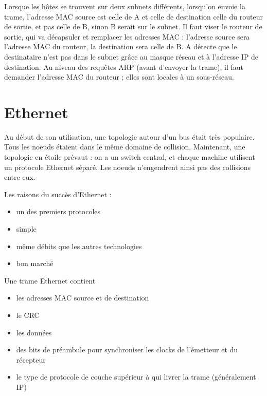 

Lorsque les hôtes se trouvent sur deux subnets différents, lorsqu'on envoie la trame, l'adresse MAC source est celle de A et celle de destination celle du routeur de sortie, et pas celle de B, sinon B serait sur le subnet. Il faut viser le routeur de sortie, qui va décapsuler et remplacer les adresses MAC : l'adresse source sera l'adresse MAC du routeur, la destination sera celle de B. A détecte que le destinataire n'est pas dans le subnet grâce au masque réseau et à l'adresse IP de destination. Au niveau des requêtes ARP (avant d'envoyer la trame), il faut demander l'adresse MAC du routeur ; elles sont locales à un sous-réseau.



\section{Ethernet}

Au début de son utilisation, une topologie autour d'un bus était très populaire. Tous les noeuds étaient dans le même domaine de collision. Maintenant, une topologie en étoile prévaut : on a un switch central, et chaque machine utilisent un protocole Ethernet séparé. Les noeuds n'engendrent ainsi pas des collisions entre eux.

	

Les raisons du succès d'Ethernet :

\begin{itemize}
	\item un des premiers protocoles
	\item simple
	\item même débits que les autres technologies
	\item bon marché
\end{itemize}


Une trame Ethernet contient

\begin{itemize}
	\item les adresses MAC source et de destination
	\item le CRC
	\item les données
	\item des bits de préambule pour synchroniser les clocks de l'émetteur et du récepteur
	\item le type de protocole de couche supérieur à qui livrer la trame (généralement IP)
\end{itemize}
				
